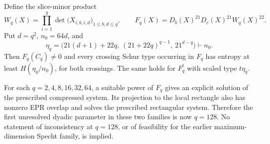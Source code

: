 \begin{proposition}
\label{pg:op-slice-determinant}
Define the slice-minor product
\[
 W_q(X)=\prod_{i=1}^q\det\bigl(X_{i,b,i,d}\bigr)_{1\leq b,d\leq q},
 \qquad
 F_q(X)=D_b(X)^{21}D_c(X)^{21}W_q(X)^{22}.
 \tag{PG-OP-slice-polynomial}
\]
Put $d=q^2$, $n_0=64d$, and
\[
 \eta_q=
 \bigl(21(d+1)+22q,\ (21+22q)^{q-1},\ 21^{d-q}\bigr)
 \vdash n_0.
 \tag{PG-OP-slice-shape}
\]
Then $F_q(C_q)\ne0$ and every crossing Schur type occurring in $F_q$
has entropy at least $H(\eta_q/n_0)$, for both crossings. The same
holds for $F_q^t$ with scaled type $t\eta_q$.

For each $q=2,4,8,16,32,64$, a suitable power of $F_q$ gives an explicit
solution of the prescribed compressed system. Its projection to the
local rectangle also has nonzero EPR overlap and solves the prescribed
rectangular system. Therefore the first unresolved dyadic parameter in
these two families is now $q=128$. No statement of inconsistency at
$q=128$, or of feasibility for the earlier maximum-dimension Specht
family, is implied.
\end{proposition}

